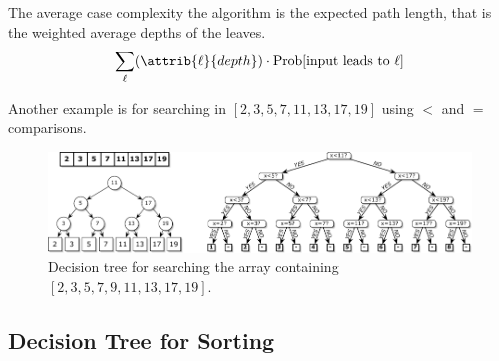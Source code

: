 The average case complexity the algorithm is the expected path length, that is the weighted average depths of the leaves.
$$
\sum_{\ell} (\attrib{\ell}{depth}) \cdot \Prob [\text{input leads to $\ell$}]
$$

Another example is for searching in $[2,3,5,7,11,13,17,19]$ using $<$ and $=$ comparisons. 

\hfill

\begin{figure}[htbp]
    \centering
    \includegraphics[width=\linewidth]{figures/binary_search_decision_tree.pdf}
    \caption{Decision tree for searching the array containing $[2,3,5,7,9,11,13,17,19]$.}
    \label{fig:sorting-tree-2}
\end{figure}

\subsection{Decision Tree for Sorting}